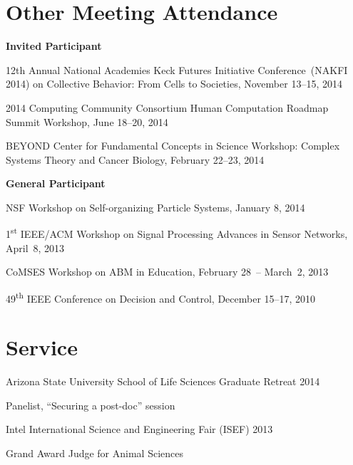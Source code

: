\section{Other Meeting Attendance}

\textbf{Invited Participant}
\begin{innerlist}
    \item 12th Annual National Academies Keck Futures Initiative
        Conference~(NAKFI 2014) on Collective Behavior: From Cells to
        Societies, November 13--15, 2014
    \item 2014 Computing Community Consortium Human Computation Roadmap
        Summit Workshop, June 18--20, 2014
    \item BEYOND Center for Fundamental Concepts in Science Workshop:
        Complex Systems Theory and Cancer Biology, February 22--23, 2014
\end{innerlist}

\textbf{General Participant}
\begin{innerlist}
    \item NSF Workshop on Self-organizing Particle Systems, January 8, 2014
    \item 1\textsuperscript{st} IEEE/ACM Workshop on Signal Processing Advances in Sensor Networks, April~8, 2013
    \item CoMSES Workshop on ABM in Education, February 28~-- March~2, 2013
    \item 49\textsuperscript{th} IEEE Conference on Decision and Control, December 15--17, 2010
\end{innerlist}

\section{Service}

Arizona State University School of Life Sciences Graduate Retreat 2014
\begin{innerlist}
    \item Panelist, ``Securing a post-doc'' session
\end{innerlist}

\halfblankline

Intel International Science and Engineering Fair (ISEF) 2013
\begin{innerlist}
    \item Grand Award Judge for Animal Sciences
\end{innerlist}

\halfblankline

